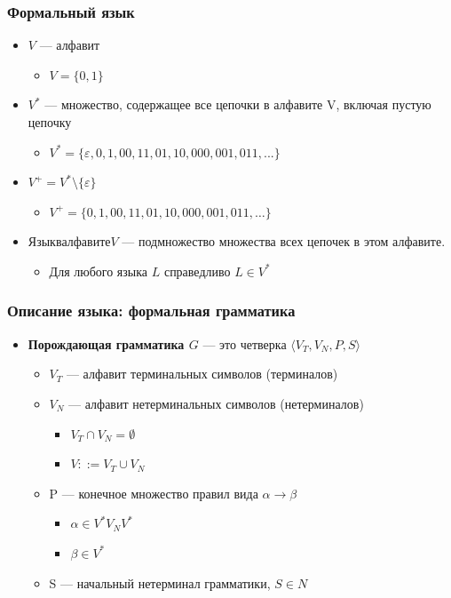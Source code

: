 \documentclass{beamer}
\begin{document}
\begin{frame}[fragile]
  \transwipe[direction=90]
  \frametitle{Формальный язык}
  \begin{itemize}
    \item $V$ --- алфавит
    \begin{itemize}
      \item $V = \{ 0, 1 \}$
    \end{itemize}
    \item $V^*$ --- множество, содержащее все цепочки в алфавите V, включая пустую цепочку
    \begin{itemize}
      \item $V^*=  \{ \varepsilon, 0, 1, 00, 11, 01, 10, 000, 001, 011, ... \}$
    \end{itemize}
    \item $V^+ = V^* \setminus \{ \varepsilon \} $ 
    \begin{itemize}
      \item $V^+ = \{0, 1, 00, 11, 01, 10, 000, 001, 011, \dots \}$
    \end{itemize}
    \item $Язык в алфавите V$ --- подмножество множества всех цепочек в этом алфавите. 
    \begin{itemize} 
      \item Для любого языка $L$ справедливо $L \in V^*$
    \end{itemize}
  \end{itemize}
\end{frame}

\begin{frame}[fragile]
  \transwipe[direction=90]
  \frametitle{Описание языка: формальная грамматика}
  \begin{itemize}
    \item \textbf{Порождающая грамматика $G$} --- это четверка $\langle V_T, V_N, P, S \rangle$

   \begin{itemize}
     \item $V_T$ --- алфавит терминальных символов (терминалов) 
     \item $V_N$ --- алфавит нетерминальных символов (нетерминалов)
     \begin{itemize} 
        \item $V_T \cap V_N = \emptyset$ 
        \item $V ::= V_T \cup V_N$
     \end{itemize}
     \item P --- конечное множество правил вида $\alpha \rightarrow \beta$
     \begin{itemize}
       \item $\alpha \in V^* V_N V^*$
       \item $\beta \in V^*$
     \end{itemize}  
     \item S --- начальный нетерминал грамматики, $S  \in N$
  \end{itemize}
  \end{itemize}
\end{frame}
\end{document}
